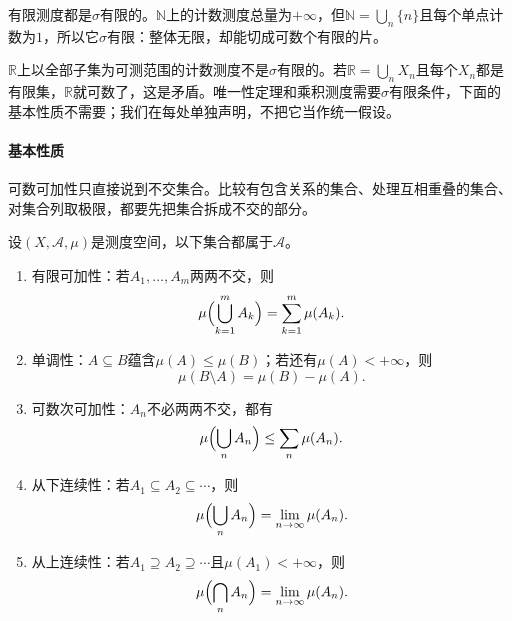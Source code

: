 有限测度都是$\sigma$有限的。$\mathbb N$上的计数测度总量为$+\infty$，但$\mathbb N=\bigcup_n\{n\}$且每个单点计数为$1$，所以它$\sigma$有限：整体无限，却能切成可数个有限的片。

$\mathbb R$上以全部子集为可测范围的计数测度不是$\sigma$有限的。若$\mathbb R=\bigcup_nX_n$且每个$X_n$都是有限集，$\mathbb R$就可数了，这是矛盾。唯一性定理和乘积测度需要$\sigma$有限条件，下面的基本性质不需要；我们在每处单独声明，不把它当作统一假设。

\paragraph{基本性质}
可数可加性只直接说到不交集合。比较有包含关系的集合、处理互相重叠的集合、对集合列取极限，都要先把集合拆成不交的部分。

\begin{theorem}[测度的基本性质]
\label{thm:meas-basic-properties}
设$(X,\mathcal A,\mu)$是测度空间，以下集合都属于$\mathcal A$。
\begin{enumerate}
 \item 有限可加性：若$A_1,\dots,A_m$两两不交，则
 \begin{equation}
  \mu\Bigl(\bigcup_{k=1}^mA_k\Bigr)=\sum_{k=1}^m\mu(A_k).
  \label{eq:meas-finite-additive}
 \end{equation}
 \item 单调性：$A\subseteq B$蕴含$\mu(A)\leq\mu(B)$；若还有$\mu(A)<+\infty$，则
 \begin{equation}
  \mu(B\setminus A)=\mu(B)-\mu(A).
  \label{eq:meas-monotone-difference}
 \end{equation}
 \item 可数次可加性：$A_n$不必两两不交，都有
 \begin{equation}
  \mu\Bigl(\bigcup_nA_n\Bigr)\leq\sum_n\mu(A_n).
  \label{eq:meas-countable-subadditive}
 \end{equation}
 \item 从下连续性：若$A_1\subseteq A_2\subseteq\cdots$，则
 \begin{equation}
  \mu\Bigl(\bigcup_nA_n\Bigr)=\lim_{n\to\infty}\mu(A_n).
  \label{eq:meas-continuity-below}
 \end{equation}
 \item 从上连续性：若$A_1\supseteq A_2\supseteq\cdots$且$\mu(A_1)<+\infty$，则
 \begin{equation}
  \mu\Bigl(\bigcap_nA_n\Bigr)=\lim_{n\to\infty}\mu(A_n).
  \label{eq:meas-continuity-above}
 \end{equation}
\end{enumerate}
\end{theorem}

